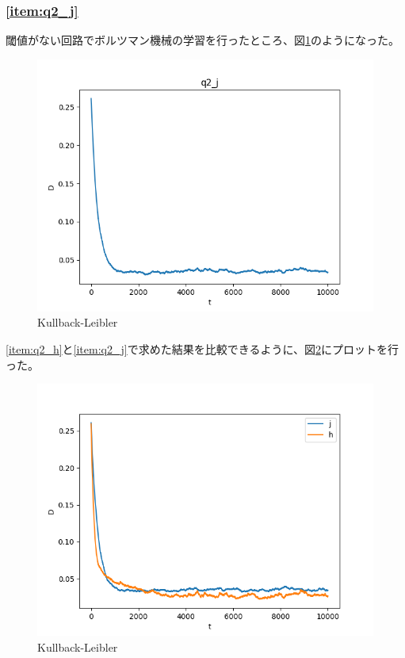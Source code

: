 \documentclass[a4j, uplatex, fleqn, dvipdfmx]{jsarticle} %
\begin{document}
\subsubsection{\ref{item:q2_j}}
閾値がない回路でボルツマン機械の学習を行ったところ、図\ref{fig:q2_j_graph}のようになった。
\begin{figure}[htbp]
  \centering
  \includegraphics[width=12cm]{images/q2_j_graph.png}
  \caption{Kullback-Leibler}
  \label{fig:q2_j_graph}
\end{figure}

\ref{item:q2_h}と\ref{item:q2_j}で求めた結果を比較できるように、図\ref{fig:q2_j_h_graph}にプロットを行った。
\begin{figure}[htbp]
  \centering
  \includegraphics[width=12cm]{images/q2_j_h_graph.png}
  \caption{Kullback-Leibler}
  \label{fig:q2_j_h_graph}
\end{figure}
\end{document}
